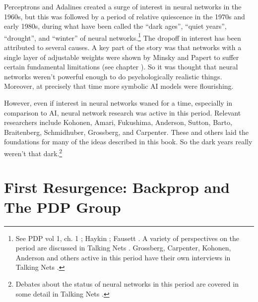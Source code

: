 
Perceptrons and Adalines created a surge of interest in neural networks in the 1960s, but this was followed by a period of relative quiescence in the 1970s and early 1980s, during what have been called the ``dark ages'', ``quiet years'', ``drought'', and ``winter'' of neural networks.\footnote{See PDP vol 1, ch. 1 \cite{rumelhart1986parallel}; Haykin \cite[p.~43]{haykin1998neural}; Fausett \cite[p.~24]{fausett1994fundamentals}. A variety of perspectives on the period are discussed in Talking Nets \cite[pp.~110, 155, 254, 305, 371]{anderson2000talking}. Grossberg, Carpenter, Kohonen, Anderson and others active in this period have their own interviews in Talking Nets \cite{anderson2000talking}.}  The dropoff in interest has been attributed to several causes. A key part of the story was that networks with a single layer of adjustable weights were shown by Minsky and Papert to suffer certain fundamental limitations \cite{minsky1969perceptrons} (see chapter ). So it was thought that neural networks weren't powerful enough to do psychologically realistic things. Moreover, at precisely that time more symbolic AI models were flourishing. 

However, even if interest in neural networks waned for a time, especially in comparison to AI, neural network research was active in this period. Relevant researchers include Kohonen, Amari, Fukushima, Anderson, Sutton, Barto, Braitenberg, Schmidhuber, Grossberg, and Carpenter. These and others laid the foundations for many of the ideas described in this book. So the dark years really weren't that dark.\footnote{Debates about the status of neural networks in this period are covered in some detail in Talking Nets \cite{anderson2000talking}.} 

\section{First Resurgence: Backprop and The PDP Group}\label{first_resurgence}

